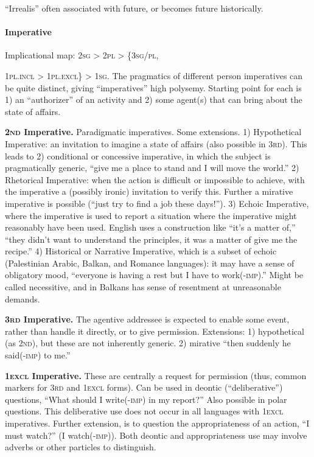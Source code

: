 \documentclass[11pt]{article}
\newcommand{\I}[1]{\textsc{#1}}   %
\begin{document}
``Irrealis'' often associated with future, or becomes future
historically. 

\paragraph{Imperative}
Implicational map: \I{2sg} > \I{2pl} > \{\I{3sg/pl}, {\I{1pl.incl} >
\I{1pl.excl}\} > \I{1sg}.  The pragmatics of different person
imperatives can be quite distinct, giving ``imperatives'' high
polysemy.  Starting point for each is 1) an ``authorizer'' of an
activity and 2) some agent(s) that can bring about the state of
affairs.

\textbf{\I{2nd} Imperative.} Paradigmatic imperatives. Some
extensions.  1) Hypothetical Imperative: an invitation to imagine a
state of affairs (also possible in \I{3rd}).  This leads to 2)
conditional or concessive imperative, in which the subject is
pragmatically generic, ``give me a place to stand and I will move the
world.'' 2) Rhetorical Imperative: when the action is difficult or
impossible to achieve, with the imperative a (possibly ironic)
invitation to verify this.  Further a mirative imperative is possible
(``just try to find a job these days!'').  3) Echoic Imperative, where
the imperative is used to report a situation where the imperative
might reasonably have been used.  English uses a construction like
``it's a matter of,'' ``they didn't want to understand the principles,
it was a matter of give me the recipe.''  4) Historical or Narrative
Imperative, which is a subset of echoic (Palestinian Arabic, Balkan,
and Romance languages): it may have a sense of obligatory mood,
``everyone is having a rest but I have to work(-\I{imp}).''  Might be
called necessitive, and in Balkans has sense of resentment at
unreasonable demands.

\textbf{\I{3rd} Imperative.} The agentive addressee is expected to
enable some event, rather than handle it directly, or to give
permission.  Extensions: 1) hypothetical (as \I{2nd}), but these are
not inherently generic.  2) mirative ``then suddenly he said(-\I{imp})
to me.''

\textbf{\I{1excl} Imperative.} These are centrally a request for
permission (thus, common markers for \I{3rd} and \I{1excl} forms).
Can be used in deontic (``deliberative'') questions, ``What should I
write(-\I{imp}) in my report?''  Also possible in polar questions.
This deliberative use does not occur in all languages with \I{1excl}
imperatives.  Further extension, is to question the appropriateness of
an action, ``I must watch?'' (I watch(-\I{imp})).  Both deontic and
appropriateness use may involve adverbs or other particles to
distinguish. 

}
\end{document}
